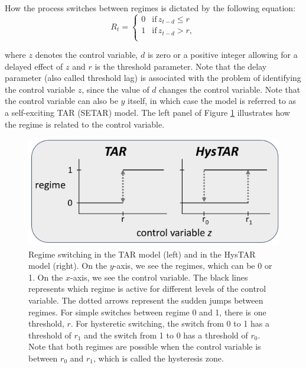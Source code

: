 \documentclass{article}
\begin{document}
How the process switches between regimes is dictated by the following equation:
\begin{equation} \label{eqn:simple_switching}
R_t = \begin{cases}
0 & \mathrm{if} \, z_{t-d} \le r \\
1 & \mathrm{if} \, z_{t-d} > r, \\
\end{cases}
\end{equation}

where $z$ denotes the control variable, $d$ is zero or a positive integer allowing for a delayed effect of $z$ and $r$ is the threshold parameter.
Note that the delay parameter (also called threshold lag) is associated with the problem of identifying the control variable $z$, since the value of $d$ changes the control variable.
Note that the control variable can also be $y$ itself, in which case the model is referred to as a self-exciting TAR (SETAR) model.
The left panel of Figure \ref{fig:simple_vs_hysteretic} illustrates how the regime is related to the control variable.

\begin{figure}
\centering
\includegraphics[scale=0.4]{simple_vs_hysteretic}
\caption{Regime switching in the TAR model (left) and in the HysTAR model (right). On the $y$-axis, we see the regimes, which can be 0 or 1. On the $x$-axis, we see the control variable. 
The black lines represents which regime is active for different levels of the control variable. The dotted arrows represent the sudden jumps between regimes.
For simple switches between regime 0 and 1, there is one threshold, $r$. For hysteretic switching, the switch from 0 to 1 has a threshold of $r_1$ and the switch from 1 to 0 has a threshold of $r_0$. Note that both regimes are possible when the control variable is between $r_0$ and $r_1$, which is called the hysteresis zone.}
\label{fig:simple_vs_hysteretic}
\end{figure}
\end{document}
